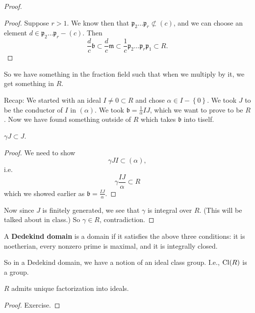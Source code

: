 \begin{proof}
\begin{proof}
Suppose $r >1$.  We know then that $\mathfrak{p}_2 \dots \mathfrak{p}_r
\not\subset (c)$, and we can choose an element $d \in \mathfrak{p}_2 \dots
\mathfrak{p}_r - (c)$.  
Then 
\[ \frac{d}{c}\mathfrak{b} \subset \frac{d}{c}\mathfrak{m} \subset
\frac{1}{c} \mathfrak{p_2}\dots \mathfrak{p}_r \mathfrak{p}_1 \subset R.  \]
\end{proof} 

So we have something in the fraction field such that when we multiply by it, we
get something in $R$.

Recap: We started with an ideal $I \neq 0 \subset R$ and chose $\alpha \in I -
\left\{0\right\}$. We took $J$ to be the conductor of $I$ in $(\alpha)$.  We
took $\mathfrak{b}=\frac{1}{\alpha} IJ$, which we want to prove to be $R$.  Now
we have found something outside of $R$ which takes $\mathfrak{b}$ into tiself.

\begin{lemma} 
$\gamma J \subset J$.
\end{lemma} 
\begin{proof} 
We need to show 
\[ \gamma J I \subset (\alpha),  \]
i.e.
\[ \gamma \frac{IJ}{\alpha} \subset R  \]
which we showed earlier as $\mathfrak{b} = \frac{IJ}{\alpha}$.
\end{proof} 
Now since $J$ is finitely generated, we see that $\gamma$ is integral over $R$. (This will be
talked about in class.) So $\gamma \in R$, contradiction.
\end{proof} 


\begin{definition} 
A \textbf{Dedekind domain} is a domain  if it satisfies the above three
conditions: it is noetherian, every nonzero prime is maximal, and it is
integrally closed.
\end{definition} 

So in a Dedekind domain, we have a notion of an ideal class group.  I.e.,
$\mathrm{Cl}(R)$ is a group.  

\begin{corollary} 
$R$ admits unique factorization into ideals.
\end{corollary} 
\begin{proof} 
Exercise.  
\end{proof}


